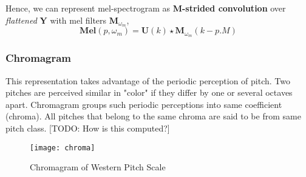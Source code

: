 \noindent Hence, we can represent mel-spectrogram as \textbf{M-strided convolution} over \textit{flattened} $\textbf{Y}$ with mel filters $\textbf{M}_{\omega_{m}}$, 
\begin{equation}
\boxed
{
  \textbf{Mel}(p, \omega_{m} ) = \textbf{U}(k) \star \textbf{M}_{\omega_{m}}(k - p.M)
}
\end{equation}
  
\subsubsection{Chromagram}

This representation takes advantage of the periodic perception of pitch. Two pitches are perceived similar in "color" if they differ by one or several octaves apart. Chromagram groups such periodic perceptions into same coefficient (chroma). All pitches that belong to the same chroma are said to be from same pitch class. [TODO: How is this computed?]
\begin{figure}[h] 
\centering
\texttt{[image: chroma]}
\caption{Chromagram of Western Pitch Scale}
 \label{fig:Chromagram}
 \end{figure}
\bigskip